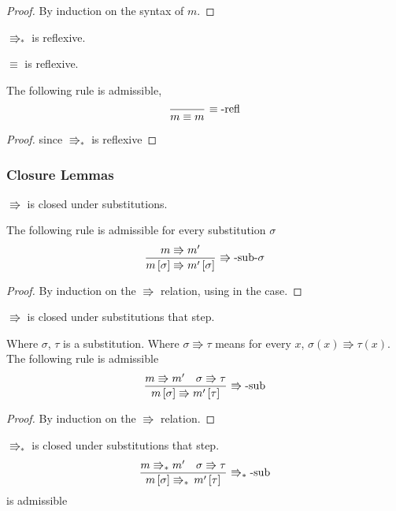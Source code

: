 \begin{proof}
By induction on the syntax of $m$.
\end{proof}
\begin{fact}
$\Rrightarrow_{\ast}$ is reflexive.
\end{fact}
 
\begin{lem}
$\equiv$ is reflexive.
 
The following rule is admissible,
\[
\frac{\,}{m\equiv m}\,\operatorname{\equiv-refl}
\]
\end{lem}
 
\begin{proof}
since $\Rrightarrow_{\ast}$ is reflexive
\end{proof}
 
\subsubsection{Closure Lemmas}
\begin{lem}
$\Rrightarrow$ is closed under substitutions.
 
The following rule is admissible for every substitution $\sigma$
\[
\frac{m\Rrightarrow m'}{m\left[\sigma\right]\Rrightarrow m'\left[\sigma\right]}\,\operatorname{\Rrightarrow-sub-\sigma}
\]
\end{lem}
 
 
\begin{proof}
By induction on the $\Rrightarrow$ relation, using  in the  case.
\end{proof}
\begin{lem}
$\Rrightarrow$ is closed under substitutions that step.
 
Where $\sigma$, $\tau$ is a substitution.
Where $\sigma\Rrightarrow\tau$ means for every $x$, $\sigma\left(x\right)\Rrightarrow\tau\left(x\right)$.
The following rule is admissible
\[
\frac{m\Rrightarrow m'\quad\sigma\Rrightarrow\tau}{m\left[\sigma\right]\Rrightarrow m'\left[\tau\right]}\,\operatorname{\Rrightarrow-sub}
\]
\end{lem}
\begin{proof}
By induction on the $\Rrightarrow$ relation.
\end{proof}
 
\begin{lem}
$\Rrightarrow_{\ast}$ is closed under substitutions that step.
\[
\frac{m\Rrightarrow_{\ast}m'\quad\sigma\Rrightarrow\tau}{m\left[\sigma\right]\Rrightarrow_{\ast}\,m'\left[\tau\right]}\,\operatorname{\Rrightarrow_{\ast}-sub}
\]
is admissible
\end{lem}
 
